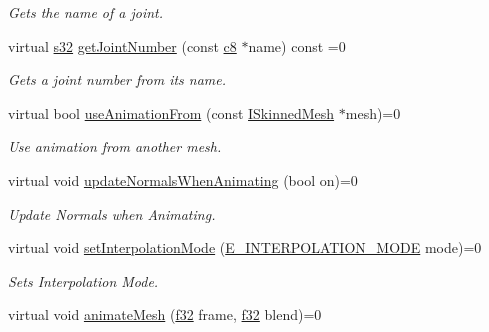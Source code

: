 \begin{DoxyCompactItemize}
\begin{DoxyCompactList}\small\item\em Gets the name of a joint. \end{DoxyCompactList}\item 
virtual \hyperlink{namespaceirr_ac66849b7a6ed16e30ebede579f9b47c6}{s32} \hyperlink{classirr_1_1scene_1_1ISkinnedMesh_ace7288f54490d017efebe24c3eb46ab8}{get\+Joint\+Number} (const \hyperlink{namespaceirr_a9395eaea339bcb546b319e9c96bf7410}{c8} $\ast$name) const =0
\begin{DoxyCompactList}\small\item\em Gets a joint number from its name. \end{DoxyCompactList}\item 
virtual bool \hyperlink{classirr_1_1scene_1_1ISkinnedMesh_a1d7d56472adeb21aada79c361bf142be}{use\+Animation\+From} (const \hyperlink{classirr_1_1scene_1_1ISkinnedMesh}{I\+Skinned\+Mesh} $\ast$mesh)=0
\begin{DoxyCompactList}\small\item\em Use animation from another mesh. \end{DoxyCompactList}\item 
virtual void \hyperlink{classirr_1_1scene_1_1ISkinnedMesh_a19f264883a006d68b44f8b81d8ff5927}{update\+Normals\+When\+Animating} (bool on)=0
\begin{DoxyCompactList}\small\item\em Update Normals when Animating. \end{DoxyCompactList}\item 
\mbox{\label{classirr_1_1scene_1_1ISkinnedMesh_afbb087c018dac08007ff5d22c6fe86b9}} 
virtual void \hyperlink{classirr_1_1scene_1_1ISkinnedMesh_afbb087c018dac08007ff5d22c6fe86b9}{set\+Interpolation\+Mode} (\hyperlink{namespaceirr_1_1scene_a26f30865cf5527e7255a8495e280314c}{E\+\_\+\+I\+N\+T\+E\+R\+P\+O\+L\+A\+T\+I\+O\+N\+\_\+\+M\+O\+DE} mode)=0
\begin{DoxyCompactList}\small\item\em Sets Interpolation Mode. \end{DoxyCompactList}\item 
\mbox{\label{classirr_1_1scene_1_1ISkinnedMesh_a5cbb9dad48413636f9e9c2ac9201cfae}} 
virtual void \hyperlink{classirr_1_1scene_1_1ISkinnedMesh_a5cbb9dad48413636f9e9c2ac9201cfae}{animate\+Mesh} (\hyperlink{namespaceirr_a0277be98d67dc26ff93b1a6a1d086b07}{f32} frame, \hyperlink{namespaceirr_a0277be98d67dc26ff93b1a6a1d086b07}{f32} blend)=0

\end{DoxyCompactItemize}
